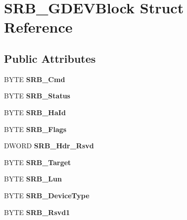 \hypertarget{structSRB__GDEVBlock}{\section{S\-R\-B\-\_\-\-G\-D\-E\-V\-Block Struct Reference}
\label{structSRB__GDEVBlock}
}
\subsection*{Public Attributes}
\begin{DoxyCompactItemize}
\item 
\hypertarget{structSRB__GDEVBlock_a92713da2cddbaaac198664525ce7cc3c}{B\-Y\-T\-E {\bfseries S\-R\-B\-\_\-\-Cmd}}\label{structSRB__GDEVBlock_a92713da2cddbaaac198664525ce7cc3c}

\item 
\hypertarget{structSRB__GDEVBlock_a911029b7e712c1aa0b4deb477d4c1130}{B\-Y\-T\-E {\bfseries S\-R\-B\-\_\-\-Status}}\label{structSRB__GDEVBlock_a911029b7e712c1aa0b4deb477d4c1130}

\item 
\hypertarget{structSRB__GDEVBlock_ad9873bc374d833ea678a0a80d4f35bfd}{B\-Y\-T\-E {\bfseries S\-R\-B\-\_\-\-Ha\-Id}}\label{structSRB__GDEVBlock_ad9873bc374d833ea678a0a80d4f35bfd}

\item 
\hypertarget{structSRB__GDEVBlock_a46a06742b1977bdc5957f03397b7be9c}{B\-Y\-T\-E {\bfseries S\-R\-B\-\_\-\-Flags}}\label{structSRB__GDEVBlock_a46a06742b1977bdc5957f03397b7be9c}

\item 
\hypertarget{structSRB__GDEVBlock_aae0cf820e31e06754df82cbc1fc713d5}{D\-W\-O\-R\-D {\bfseries S\-R\-B\-\_\-\-Hdr\-\_\-\-Rsvd}}\label{structSRB__GDEVBlock_aae0cf820e31e06754df82cbc1fc713d5}

\item 
\hypertarget{structSRB__GDEVBlock_ae23b3a996bb79c3072e14049dfb08f60}{B\-Y\-T\-E {\bfseries S\-R\-B\-\_\-\-Target}}\label{structSRB__GDEVBlock_ae23b3a996bb79c3072e14049dfb08f60}

\item 
\hypertarget{structSRB__GDEVBlock_af4410e362f31e26ba5600ed7ae07c36e}{B\-Y\-T\-E {\bfseries S\-R\-B\-\_\-\-Lun}}\label{structSRB__GDEVBlock_af4410e362f31e26ba5600ed7ae07c36e}

\item 
\hypertarget{structSRB__GDEVBlock_afdab78be9d1be5d76c5aec3d733a77de}{B\-Y\-T\-E {\bfseries S\-R\-B\-\_\-\-Device\-Type}}\label{structSRB__GDEVBlock_afdab78be9d1be5d76c5aec3d733a77de}

\item 
\hypertarget{structSRB__GDEVBlock_a0eecc75af6aad8e3398726a1f283c1a4}{B\-Y\-T\-E {\bfseries S\-R\-B\-\_\-\-Rsvd1}}\label{structSRB__GDEVBlock_a0eecc75af6aad8e3398726a1f283c1a4}

\end{DoxyCompactItemize}


